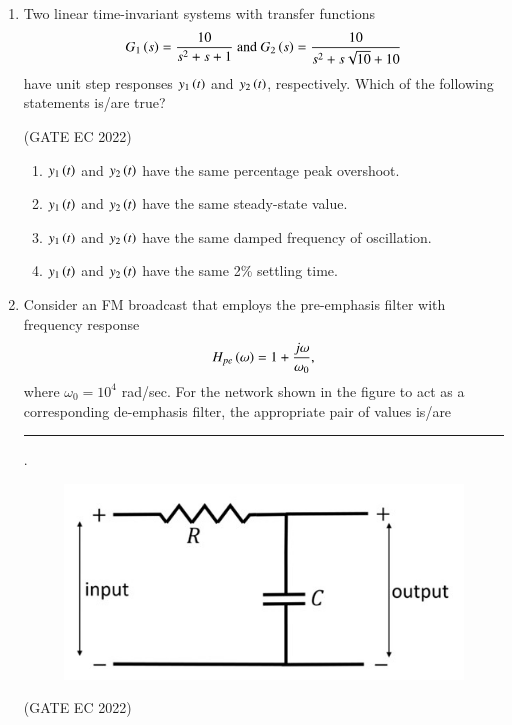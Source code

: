 \documentclass[journal,12pt,onecolumn]{IEEEtran}
\theoremstyle{remark}
\begin{document}
\begin{enumerate}
    \item Two linear time-invariant systems with transfer functions
    \begin{align}
    G_1\left(s\right) = \frac{10}{s^2+s+1}  \text{ and } G_2\left(s\right) = \frac{10}{s^2+s\sqrt{10}+10} 
    \end{align}
    have unit step responses $y_1\left(t\right)$ and $y_2\left(t\right)$, respectively. Which of the following statements is/are true?
    
    \hfill{(GATE EC 2022)}
    \begin{enumerate}
        \item $y_1\left(t\right)$ and $y_2\left(t\right)$ have the same percentage peak overshoot.
        \item $y_1\left(t\right)$ and $y_2\left(t\right)$ have the same steady-state value.
        \item $y_1\left(t\right)$ and $y_2\left(t\right)$ have the same damped frequency of oscillation.
        \item $y_1\left(t\right)$ and $y_2\left(t\right)$ have the same 2\% settling time.
    \end{enumerate}
    
    \item Consider an FM broadcast that employs the pre-emphasis filter with frequency response
    \begin{align*}
    H_{pe}\left(\omega\right) = 1 + \frac{j\omega}{\omega_0},
    \end{align*}
    where $\omega_0 = 10^4$ rad/sec. For the network shown in the figure  to act as a corresponding de-emphasis filter, the appropriate pair of  values is/are \rule{2cm}{0.4pt}.
    \begin{figure}[H]
        \centering
        \includegraphics[width=0.5\columnwidth]{figs/m24.jpg}
        \caption*{}
        \label{fig:m24}
    \end{figure}
    
    \hfill{(GATE EC 2022)}
    \begin{enumerate}
    \end{enumerate}


\end{enumerate}
\end{document}
